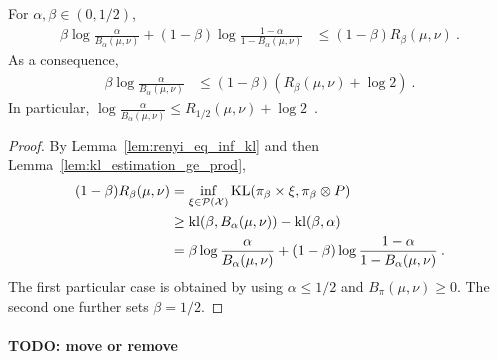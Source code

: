 \begin{theorem}
  \label{thm:log_inv_bayesBinaryRisk_le_renyi}
  For $\alpha, \beta \in (0, 1/2)$,
  \begin{align*}
  \beta \log\frac{\alpha}{B_\alpha(\mu, \nu)} + (1 - \beta) \log\frac{1 - \alpha}{1 - B_\alpha(\mu, \nu)}
  &\le (1 - \beta) R_{\beta}(\mu, \nu)
  \: .
  \end{align*}
  As a consequence,
  \begin{align*}
  \beta \log\frac{\alpha}{B_\alpha(\mu, \nu)}
  &\le (1 - \beta) (R_{\beta}(\mu, \nu) + \log 2)
  \: .
  \end{align*}
  In particular, $\log\frac{\alpha}{B_\alpha(\mu, \nu)} \le R_{1/2}(\mu, \nu) + \log 2$~.
\end{theorem}

\begin{proof}%
{}
By Lemma~\ref{lem:renyi_eq_inf_kl} and then Lemma~\ref{lem:kl_estimation_ge_prod},
\begin{align*}
(1 - \beta) R_{\beta}(\mu, \nu)
&= \inf_{\xi \in \mathcal P(\mathcal X)} \operatorname{KL}(\pi_\beta \times \xi, \pi_\beta \otimes P)
\\
&\ge \operatorname{kl}(\beta, B_\alpha(\mu, \nu)) - \operatorname{kl}(\beta, \alpha)
\\
&= \beta \log\frac{\alpha}{B_\alpha(\mu, \nu)} + (1 - \beta)\log\frac{1 - \alpha}{1 - B_\alpha(\mu, \nu)}
\: .
\end{align*}
The first particular case is obtained by using $\alpha \le 1/2$ and $B_\pi(\mu, \nu) \ge 0$.
The second one further sets $\beta = 1/2$.
\end{proof}





\paragraph{TODO: move or remove}



